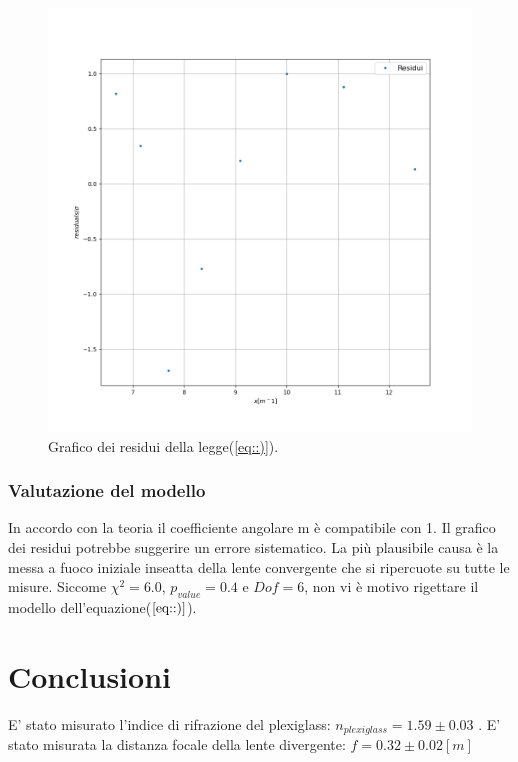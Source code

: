 \documentclass{article}
\begin{document}
\begin{figure}[h!]
	\includegraphics[width=\textwidth]{Dati_raccolti_residuilen.png}
	\caption{Grafico dei residui della legge(\ref{eq::)}).}
	\label{fig:lenres}
\end{figure}

\subsubsection{Valutazione del modello}

In accordo con la teoria il coefficiente angolare m è compatibile con 1.
Il grafico dei residui potrebbe suggerire un errore sistematico. La più plausibile causa è la messa a fuoco iniziale inseatta della lente convergente che si ripercuote su tutte le misure.
Siccome $\chi^2= 6.0$, $p_{value}= 0.4$  e $Dof= 6$,  non vi è motivo rigettare il modello dell'equazione($\ref{eq::)}$).


\section{Conclusioni}

E' stato misurato l'indice di rifrazione del plexiglass: $n_{plexiglass}= 1.59\pm 0.03$ .
E' stato misurata la distanza focale della lente divergente: $f=0.32\pm0.02 [m]$
\end{document}
